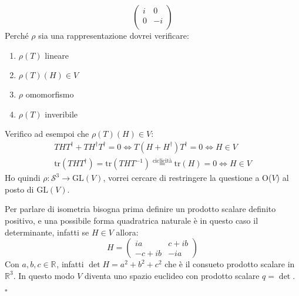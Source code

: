 \documentclass[10pt, twoside=false, x11names]{scrbook}
\newenvironment{proof}{{\textbf{Dimostrazione}:}}{\hfill $\square$}
\newcommand{\RN}[1][]{\mathbb{R}^#1}
\newcommand{\Sph}[1][]{\mathcal{S}^#1}
\newcommand{\tr}{\mathrm{tr}}
\begin{document}
\begin{proof}
\[\begin{pmatrix}
      i & 0 \\
      0 & -i \\
    \end{pmatrix}
  \]
  Perché $ \rho $ sia una rappresentazione dovrei verificare:
  \begin{enumerate}
  \item $ \rho(T) $ lineare
  \item $ \rho(T)(H) \in V $
  \item $ \rho $ omomorfismo
  \item $ \rho(T) $ inveribile
  \end{enumerate}
  Verifico ad esempoi che $ \rho(T)(H) \in V $:
  \begin{gather*}
    THT^\dagger + TH^\dagger T^\dagger = 0 \iff T(H + H^\dagger)T^\dagger = 0 \iff H \in V \\
    \tr(THT^\dagger) = \tr(THT^{-1}) \overset{\text{ciclicità}}{=} \tr(H) = 0 \iff H \in V
  \end{gather*}
  Ho quindi $ \rho \colon \Sph{3} \to \mathrm{GL}(V) $, vorrei cercare di restringere
  la questione a O($ V $) al posto di $ \mathrm{GL}(V) $.

  Per parlare di isometria bisogna prima definire un prodotto scalare definito
  positivo, e una possibile forma quadratrica naturale è in questo caso il determinante, infatti
  se $ H \in V $ allora:
  \[
    H =
    \begin{pmatrix}
      i a & c + i b \\
      -c + i b & - i a
    \end{pmatrix}
  \]
  Con $ a,b,c \in \RN{} $, infatti $ \det{H} = a^2 + b^2 + c^2 $ che è il consueto
  prodotto scalare in $ \RN{3} $. In questo modo $ V $ diventa uno spazio euclideo
  con prodotto scalare $ q = \det $.


\end{proof}
\end{document}

